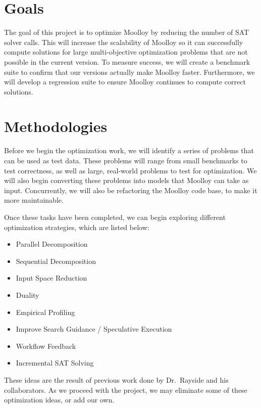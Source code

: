\documentclass[11pt]{article}
\begin{document}
\section{Goals}
The goal of this project is to optimize Moolloy by reducing the number
of SAT solver calls. This will increase the scalability of Moolloy so
it can successfully compute solutions for large multi-objective
optimization problems that are not possible in the current version.
To measure success, we will create a benchmark suite to confirm that
our versions actually make Moolloy faster. Furthermore, we will develop
a regression suite to ensure Moolloy continues to compute correct
solutions.

\section{Methodologies}
Before we begin the optimization work, we will identify a series of
problems that can be used as test data. These problems will range from
small benchmarks to test correctness, as well as large, real-world
problems to test for optimization. We will also begin converting these
problems into models that Moolloy can take as input. Concurrently, we
will also be refactoring the Moolloy code base, to make it more
maintainable.

Once these tasks have been completed, we can begin exploring different
optimization strategies, which are listed below:

\begin{itemize}
  \item Parallel Decomposition
  \item Sequential Decomposition
  \item Input Space Reduction
  \item Duality
  \item Empirical Profiling
  \item Improve Search Guidance / Speculative Execution
  \item Workflow Feedback
  \item Incremental SAT Solving
\end{itemize}

These ideas are the result of previous work done by Dr.\ Rayside and
his collaborators. As we proceed with the project, we may eliminate
some of these optimization ideas, or add our own.
\end{document}
